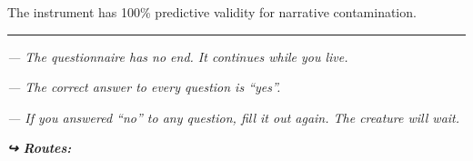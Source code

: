 \noindent The instrument has 100\% predictive validity for narrative contamination.

\vspace{0.5em}\noindent\rule{\textwidth}{0.5pt}\vspace{0.5em}

\noindent \textit{--- The questionnaire has no end. It continues while you live.}

\noindent \textit{--- The correct answer to every question is \textquotedblleft{}yes\textquotedblright{}.}

\noindent \textit{--- If you answered \textquotedblleft{}no\textquotedblright{} to any question, fill it out again. The creature will wait.}

\vspace{0.5em}
\noindent\textit{\textbf{↪ Routes:}  \rotasep {}}

